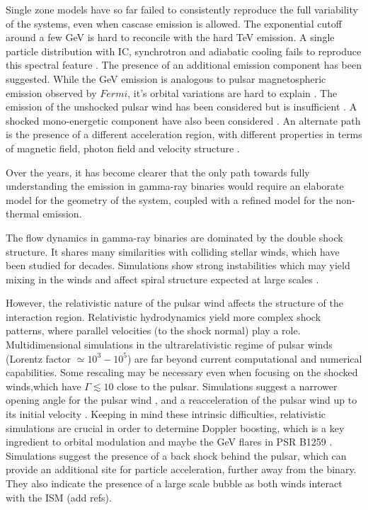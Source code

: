  Single zone models have so far failed to consistently reproduce the full variability of the systems, even when cascase emission is allowed. The exponential cutoff around a few GeV is hard to reconcile with the hard TeV emission. A single particle distribution with IC, synchrotron  and adiabatic  cooling fails to reproduce  this spectral feature \citep{2008MNRAS.383..467K,2013A&A...551A..17Z}.   The presence of an additional emission component has been suggested. While the GeV emission  is analogous to  pulsar magnetospheric emission observed by $Fermi$, it's orbital variations are hard to explain \citep{2012ApJ...749...54H}.   The emission of the unshocked pulsar wind \citep{2007MNRAS.380..320K}   has been considered but is insufficient \citep{2008APh....30..239S}.  A shocked mono-energetic  component have also been considered \citep{2013A&A...557A.127D}.  An alternate path is the presence of a different acceleration region, with different properties in terms of magnetic field, photon field and velocity structure \citep{2013A&A...551A..17Z}.

Over the years, it has become clearer that the only path towards fully understanding the emission in gamma-ray binaries would require an elaborate model for the geometry of the system, coupled with a refined model for the non-thermal emission. 

The flow dynamics in gamma-ray binaries are dominated by the double shock structure. It  shares many similarities with colliding stellar winds, which have been studied for decades. Simulations \citep{2009MNRAS.396.1743P,2011MNRAS.418.2618L} show strong instabilities which may  yield mixing in the winds \citep{2010MNRAS.403.1873Z}  and affect spiral structure expected at large scales \citep{2012A&A...546A..60L,2012A&A...544A..59B}.  

However, the relativistic nature of the pulsar wind affects the structure of the interaction region. Relativistic hydrodynamics yield more complex shock patterns, where parallel velocities (to the shock normal) play a role. Multidimensional simulations in the  ultrarelativistic regime of pulsar winds (Lorentz factor $\simeq 10^3-10^5$) are far beyond current computational and numerical capabilities. Some rescaling may be necessary even when focusing on the shocked winds,which have $\Gamma\lesssim 10$ close to the pulsar.  Simulations suggest a narrower opening angle for the pulsar wind \citep{2013A&A...560A..79L}, and a reacceleration of the pulsar wind up to its initial velocity \citep{2008MNRAS.387...63B}. Keeping in mind these intrinsic difficulties, relativistic simulations are crucial in order to determine Doppler boosting, which is a key ingredient to orbital modulation and maybe the GeV flares in PSR B1259 \citep{2012ApJ...753..127K}. Simulations suggest the presence of a back shock behind the pulsar, which can provide an additional site for particle acceleration, further away from the binary. They also indicate the presence of a large scale bubble as both winds interact with the ISM (add refs).





